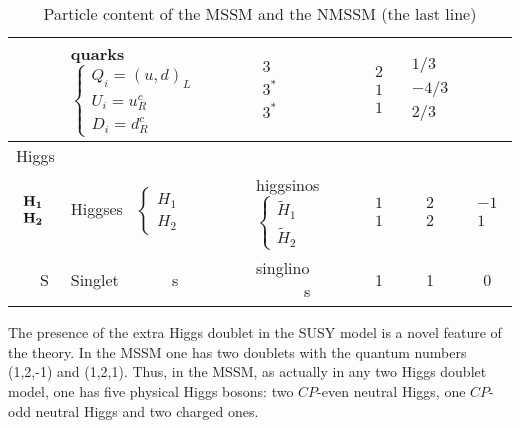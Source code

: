 \documentclass{cernyrep}
\begin{document}
\begin{table}[htb]
\begin{center}
\begin{tabular}{|lllccc|}
& quarks \ $\left\{
\begin{array}{l}
Q_i=(u,d)_L \\ U_i=u_R^c \\ D_i=d_R^c
\end{array} \right. $
& $\begin{array}{l}
3 \\ 3^* \\ 3^*
\end{array} $
& $\begin{array}{l}
2 \\ 1 \\ 1
\end{array} $
& $\begin{array}{r}
1/3 \\ -4/3 \\ 2/3
\end{array} $ \\
\hline  \hline
Higgs &&&&& \\
$\begin{array}{c} {\bf H_1} \\ {\bf H_2}
\end{array}$
& Higgses \ $\left\{
\begin{array}{l}
H_1 \\ H_2
\end{array}  \right. $
& higgsinos \ $\left\{
\begin{array}{l}
\tilde{H}_1 \\ \tilde{H}_2
\end{array} \right. $
&
$\begin{array}{l}
1 \\ 1 \end{array} $
& $\begin{array}{l}
2 \\ 2
\end{array} $
& $\begin{array}{r} -1 \\ 1
\end{array} $  \\
\hline \hline
\ \ \ S & Singlet \ \ \ \ \ \  s & singlino \ \  \ \ \ \ s & 1 & 1 & 0\\
\hline \hline
\end{tabular}
\end{center}
\label{tab:mssm}
\caption{Particle content of the MSSM and the NMSSM (the last line)}
\end{table}

The presence of the extra Higgs doublet in the SUSY model is
a novel feature of the theory. In the MSSM one has two doublets
with the quantum numbers (1,2,-1) and (1,2,1). Thus, in
the MSSM, as actually in any two Higgs doublet model, one has
five physical Higgs bosons: two $CP$-even neutral Higgs, one
$CP$-odd neutral Higgs and two charged ones. 
\end{document}
